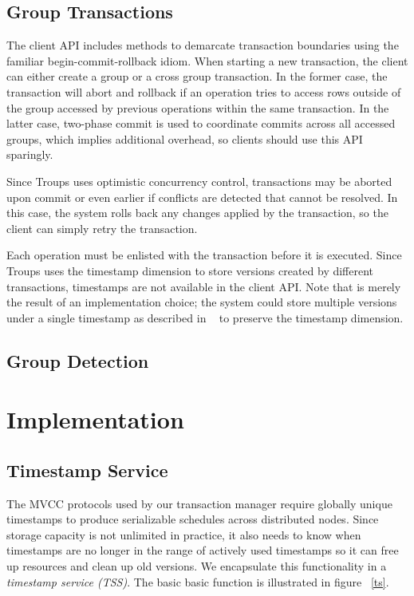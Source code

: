 \documentclass[10pt,final,journal]{IEEEtran}
\begin{document}
\subsection{Group Transactions}
The client API includes methods to demarcate transaction boundaries using the familiar begin-commit-rollback idiom. When starting a new transaction, the client can either create a group or a cross group transaction. In the former case, the transaction will abort and rollback if an operation tries to access rows outside of the group accessed by previous operations within the same transaction. In the latter case, two-phase commit is used to coordinate commits across all accessed groups, which implies additional overhead, so clients should use this API sparingly.

Since Troups uses optimistic concurrency control, transactions may be aborted upon commit or even earlier if conflicts are detected that cannot be resolved. In this case, the system rolls back any changes applied by the transaction, so the client can simply retry the transaction.

Each operation must be enlisted with the transaction before it is executed. Since Troups uses the timestamp dimension to store versions created by different transactions, timestamps are not available in the client API. Note that is merely the result of an implementation choice; the system could store multiple versions under a single timestamp as described in ~\cite{Peng:2010:LIP:1924943.1924961} to preserve the timestamp dimension.

\subsection{Group Detection}


\section{Implementation}

\subsection{Timestamp Service}
The MVCC protocols used by our transaction manager require globally unique timestamps to produce serializable schedules across distributed nodes. Since storage capacity is not unlimited in practice, it also needs to know when timestamps are no longer in the range of actively used timestamps so it can free up resources and clean up old versions. We encapsulate this functionality in a \emph{timestamp service (TSS)}. The basic basic function is illustrated in figure ~\ref{ts}.
\end{document}
